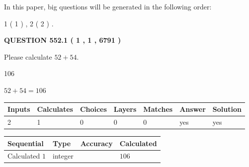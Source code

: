 \documentclass[12pt]{article}
\begin{document}
In this paper, big questions will be generated in the following order: 
   
   
   1 ( 1 )
 ,
   2 ( 2 )
 .
  
\vspace{0.2in}
  
{\textbf{\Large{QUESTION
552.1 
 ( 1 , 1 , 6791 )
}}}
  
  
 
Please calculate $ %
52 +  %
54 $.
 
 
 
\noindent{}
 
 

106
 
 
\noindent{}
 
 

 
 
 
\noindent{}
 
 

$ %
52 +  %
54=   %
106$
 
 
\noindent{}
 
 

 
   
   
   
   
\noindent\begin{tabular}{|l|l|l|l|l|l|l|}
 \hline
Inputs & Calculates & Choices & Layers & Matches & Answer & Solution \\ \hline
 2  & 
 1  & 
 0
  & 
 0  & 
 0  & 
  yes & 
  yes 
  \\ \hline
 \end{tabular}
   
   
   
   
\noindent{}
   
   
  
  
\noindent\begin{tabular}{|l|l|l|l|}
\hline
 Sequential & Type & Accuracy & Calculated \\ 
\hline
 
 
  Calculated $  1 $ & integer &  & 
  $ 106 $ 
 \\  \hline  
 \end{tabular}
   
\end{document}
